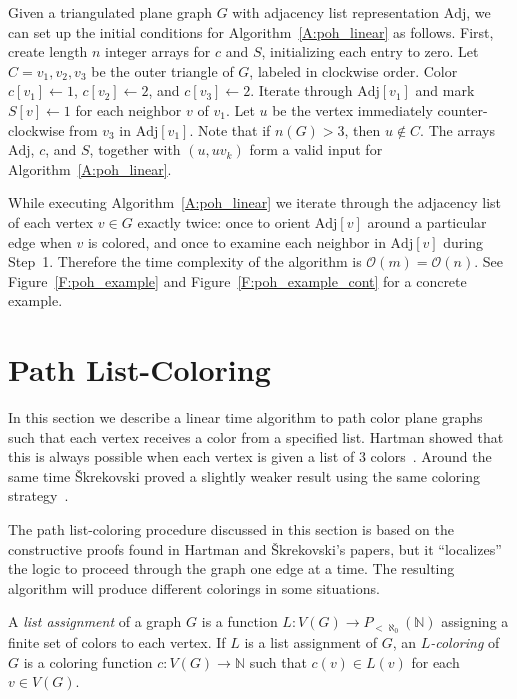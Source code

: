 \documentclass[12pt,letterpaper]{article}
\theoremstyle{plain}
\theoremstyle{definition}
\theoremstyle{break}
\newcommand{\defterm}[1]{\emph{#1}} %
\begin{document}
Given a triangulated plane graph $G$ with adjacency list representation
$\text{Adj}$, we can set up the initial conditions for
Algorithm~\ref{A:poh_linear} as follows. First, create length $n$ integer
arrays for $c$ and $S$, initializing each entry to zero.
Let $C=v_1,v_2,v_3$ be the outer triangle of $G$,
labeled in clockwise order.
Color $c[v_1]\leftarrow 1$, $c[v_2]\leftarrow 2$, and
$c[v_3]\leftarrow 2$.
Iterate through $\text{Adj}[v_1]$ and mark $S[v]\leftarrow 1$ for each
neighbor $v$ of $v_1$.
Let $u$ be the vertex immediately counter-clockwise from $v_3$ in
$\text{Adj}[v_1]$. Note that if $n(G)>3$, then $u\not\in C$.
The arrays $\text{Adj}$, $c$, and $S$, together with
$(u, uv_k)$ form a valid input for Algorithm~\ref{A:poh_linear}.

While executing Algorithm~\ref{A:poh_linear} we iterate through
the adjacency list of each vertex $v\in G$ exactly twice: once to
orient $\text{Adj}[v]$
around a particular edge when $v$ is colored,
and once to examine each neighbor in $\text{Adj}[v]$ during Step~1.
Therefore the time complexity of the algorithm is
$\mathcal{O}(m)=\mathcal{O}(n)$. See Figure~\ref{F:poh_example} 
and Figure~\ref{F:poh_example_cont} for a concrete example.

\section{Path List-Coloring}

In this section we describe a linear time algorithm to path color
plane graphs such that each vertex receives a color from a specified list.
Hartman showed that this is always possible when each vertex is given a
list of $3$ colors~\cite[Thm.~4.1]{Har1997}. Around the same
time \v{S}krekovski proved a
slightly weaker result using the same coloring
strategy~\cite[Thm.~2.2b]{Skr1999}.

The path list-coloring procedure discussed in this section is
based on the constructive proofs found in Hartman and
\v{S}krekovski's papers, but it ``localizes'' the logic to proceed through the
graph one edge at a time. The resulting algorithm
will produce different colorings in some situations.

A \defterm{list assignment} of a graph $G$ is
a function $L:V(G)\to P_{<\aleph_0}(\mathbb{N})$ assigning
a finite set of colors to each vertex. If $L$ is a list assignment of $G$,
an \defterm{$L$-coloring} of $G$ is a coloring function
$c:V(G)\to\mathbb{N}$ such that $c(v)\in L(v)$ for each $v\in V(G)$.
\end{document}
